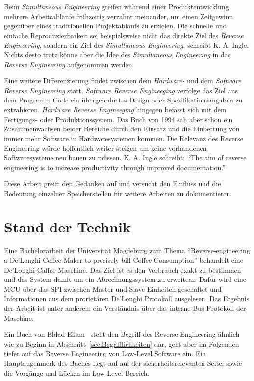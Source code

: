 Beim \textit{Simultaneous Engineering} greifen während einer Produktentwicklung mehrere Arbeitsabläufe frühzeitig verzahnt ineinander, um einen Zeitgewinn gegenüber eines traditionellen Projektablaufs zu erzielen.
Die schnelle und einfache Reproduzierbarkeit sei beispielsweise nicht das direkte Ziel des \textit{Reverse Engineering}, sondern ein Ziel des \textit{Simultaneous Engineering}, schreibt K. A. Ingle.
Nichts desto trotz könne aber die Idee des \textit{Simultaneous Engineering} in das \textit{Reverse Engineering} aufgenommen werden.

Eine weitere Differenzierung findet zwischen dem \textit{Hardware-} und dem \textit{Software Reverse Engineering} statt.
\textit{Software Reverse Engineeging} verfolge das Ziel aus dem Programm Code ein übergeordnetes Design oder Spezifikationsangaben zu extrahieren.
\textit{Hardware Reverse Engineeging} hingegen befasst sich mit dem Fertigungs- oder Produktionssystem.
Das Buch von 1994 sah aber schon ein Zusammenwachsen beider Bereiche durch den Einsatz und die Einbettung von immer mehr Software in Hardwaresystemen kommen.
Die Relevanz des Reverse Engineering würde hoffentlich weiter steigen um keine vorhandenen Softwaresysteme neu bauen zu müssen.
K. A. Ingle schreibt: "`The aim of reverse engineering is to increase productivity through improved documentation."'\cite{Solr-153077417}

Diese Arbeit greift den Gedanken auf und versucht den Einfluss und die Bedeutung einzelner Speicherstellen für weitere Arbeiten zu dokumentieren.

\section{Stand der Technik}
Eine Bachelorarbeit der Universität Magdeburg zum Thema "`Reverse-engineering a De'Longhi Coffee Maker to precisely bill Coffee Consumption"'\cite{BachelorarbeitDeLonghi} behandelt eine De'Longhi Caffee Maschine.
Das Ziel ist es den Verbrauch exakt zu bestimmen und das System damit um ein Abrechnungssystem zu erweitern.
Dafür wird eine \ac{MCU} über das \ac{SPI} zwischen Master und Slave Einheiten geschaltet und Informationen aus dem prorietären De'Longhi Protokoll ausgelesen.
Das Ergebnis der Arbeit ist unter anderem ein Verständnis über das interne Bus Protokoll der Maschine.

Ein Buch von Eldad Eilam~\cite{Solr-480966761} stellt den Begriff des Reverse Engineering ähnlich wie zu Beginn in Abschnitt~\ref{sec:Begrifflichkeiten} dar, geht aber im Folgenden tiefer auf das Reverse Engineering von Low-Level Software ein.
Ein Hauptaugenmerk des Buches liegt auf auf der sicherheitsrelevanten Seite, sowie die Vorgänge und Lücken im Low-Level Bereich.

